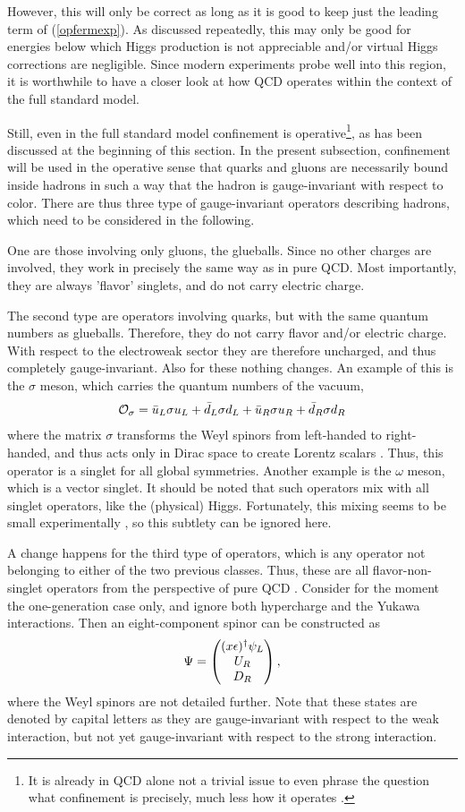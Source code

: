 \documentclass[final,12pt]{article}
\newcommand*{\no}{\noindent}
\newcommand*{\be}{\begin{equation}}
\newcommand*{\ee}{\end{equation}}
\newcommand*{\pref}[1]{(\ref{#1})}
\newcommand*{\1}{1\!\!\!\bot}
\newcommand*{\bma}{\begin{matrix}}
\newcommand*{\ema}{\end{matrix}}
\newcommand*{\bpm}{\left(\bma}
\newcommand*{\epm}{\ema\right)}
\newcommand*{\op}{{\cal O}}
\begin{document}
However, this will only be correct as long as it is good to keep just the leading term of \pref{opfermexp}. As discussed repeatedly, this may only be good for energies below which Higgs production is not appreciable and/or virtual Higgs corrections are negligible. Since modern experiments probe well into this region, it is worthwhile to have a closer look at how QCD operates within the context of the full standard model.

Still, even in the full standard model confinement is operative\footnote{It is already in QCD alone not a trivial issue to even phrase the question what confinement is precisely, much less how it operates \cite{Greensite:2011zz,Greensite:2017ajx,Greensite:2018mhh}.}, as has been discussed at the beginning of this section. In the present subsection, confinement will be used in the operative sense that quarks and gluons are necessarily bound inside hadrons in such a way that the hadron is gauge-invariant with respect to color. There are thus three type of gauge-invariant operators describing hadrons, which need to be considered in the following.

One are those involving only gluons, the glueballs. Since no other charges are involved, they work in precisely the same way as in pure QCD. Most importantly, they are always 'flavor' singlets, and do not carry electric charge.

The second type are operators involving quarks, but with the same quantum numbers as glueballs. Therefore, they do not carry flavor and/or electric charge. With respect to the electroweak sector they are therefore uncharged, and thus completely gauge-invariant. Also for these nothing changes. An example of this is the $\sigma$ meson, which carries the quantum numbers of the vacuum,
\be
\op_\sigma=\bar{u}_L\sigma u_L+\bar{d}_L\sigma d_L+\bar{u}_R\sigma u_R+\bar{d}_R\sigma d_R\label{sigma}
\ee
\no where the matrix $\sigma$ transforms the Weyl spinors from left-handed to right-handed, and thus acts only in Dirac space to create Lorentz scalars \cite{Aitchison:2007fn}. Thus, this operator is a singlet for all global symmetries. Another example is the $\omega$ meson, which is a vector singlet. It should be noted that such operators mix with all singlet operators, like the (physical) Higgs. Fortunately, this mixing seems to be small experimentally \cite{pdg}, so this subtlety can be ignored here.

A change happens for the third type of operators, which is any operator not belonging to either of the two previous classes. Thus, these are all flavor-non-singlet operators from the perspective of pure QCD \cite{Egger:2017tkd}. Consider for the moment the one-generation case only, and ignore both hypercharge and the Yukawa interactions. Then an eight-component spinor can be constructed as
\be
\Psi=\bpm (x\epsilon)^\dagger\psi_L\cr U_R \cr D_R\epm\label{qcdquark},
\ee
\no where the Weyl spinors are not detailed further. Note that these states are denoted by capital letters as they are gauge-invariant with respect to the weak interaction, but not yet gauge-invariant with respect to the strong interaction.
\end{document}
